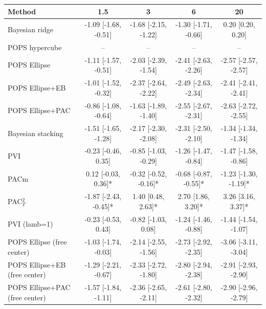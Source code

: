 \begin{tabular}{lcccc}
\toprule
Method & 1.5 & 3 & 6 & 20 \\
\midrule
Bayesian ridge & -1.09 {\scriptsize[-1.68, -0.51]} & -1.68 {\scriptsize[-2.15, -1.22]} & -1.30 {\scriptsize[-1.71, -0.66]} & 0.20 {\scriptsize[0.20, 0.20]} \\
POPS hypercube & -- & -- & -- & -- \\
POPS Ellipse & -1.11 {\scriptsize[-1.57, -0.51]} & -2.03 {\scriptsize[-2.39, -1.54]} & -2.41 {\scriptsize[-2.63, -2.26]} & -2.57 {\scriptsize[-2.57, -2.57]} \\
POPS Ellipse+EB & -1.01 {\scriptsize[-1.52, -0.32]} & -2.37 {\scriptsize[-2.64, -2.22]} & -2.49 {\scriptsize[-2.63, -2.34]} & -2.41 {\scriptsize[-2.41, -2.41]} \\
POPS Ellipse+PAC & -0.86 {\scriptsize[-1.08, -0.64]} & -1.63 {\scriptsize[-1.89, -1.40]} & -2.55 {\scriptsize[-2.67, -2.31]} & -2.63 {\scriptsize[-2.72, -2.55]} \\
Bayesian stacking & -1.51 {\scriptsize[-1.65, -1.28]} & -2.17 {\scriptsize[-2.30, -2.08]} & -2.31 {\scriptsize[-2.50, -2.10]} & -1.34 {\scriptsize[-1.34, -1.34]} \\
PVI & -0.23 {\scriptsize[-0.46, 0.35]} & -0.85 {\scriptsize[-1.03, -0.29]} & -1.26 {\scriptsize[-1.47, -0.84]} & -1.47 {\scriptsize[-1.58, -0.86]} \\
PACm & 0.12 {\scriptsize[-0.03, 0.36]}* & -0.32 {\scriptsize[-0.52, -0.16]}* & -0.68 {\scriptsize[-0.87, -0.55]}* & -1.23 {\scriptsize[-1.30, -1.19]}* \\
PAC$^2_T$ & -1.87 {\scriptsize[-2.43, -0.45]}* & 1.40 {\scriptsize[0.48, 2.63]}* & 2.70 {\scriptsize[1.86, 3.20]}* & 3.26 {\scriptsize[3.16, 3.37]}* \\
PVI (lamb=1) & -0.23 {\scriptsize[-0.53, 0.43]} & -0.82 {\scriptsize[-1.03, 0.08]} & -1.24 {\scriptsize[-1.46, -0.88]} & -1.44 {\scriptsize[-1.54, -1.07]} \\
POPS Ellipse (free center) & -1.03 {\scriptsize[-1.74, -0.03]} & -2.14 {\scriptsize[-2.55, -1.56]} & -2.73 {\scriptsize[-2.92, -2.35]} & -3.06 {\scriptsize[-3.11, -3.04]} \\
POPS Ellipse+EB (free center) & -1.29 {\scriptsize[-2.21, -0.67]} & -2.33 {\scriptsize[-2.72, -1.80]} & -2.80 {\scriptsize[-2.94, -2.38]} & -2.91 {\scriptsize[-2.93, -2.90]} \\
POPS Ellipse+PAC (free center) & -1.57 {\scriptsize[-1.84, -1.11]} & -2.36 {\scriptsize[-2.65, -2.11]} & -2.61 {\scriptsize[-2.80, -2.32]} & -2.90 {\scriptsize[-2.96, -2.79]} \\
\bottomrule
\end{tabular}

